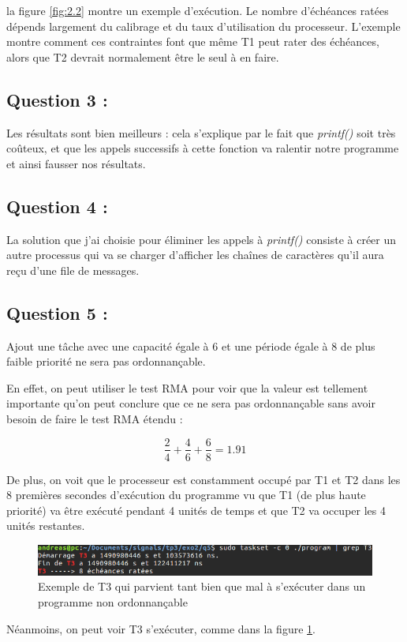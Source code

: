 \documentclass{article}
\begin{document}
la figure \ref{fig:2.2} montre un exemple d'exécution. Le nombre d'échéances ratées dépends largement du calibrage et du taux d'utilisation du processeur. L'exemple montre comment ces contraintes font que même T1 peut rater des échéances, alors que T2 devrait normalement être le seul à en faire.

\subsection*{Question 3 :}

Les résultats sont bien meilleurs : cela s'explique par le fait que \textit{printf()} soit très coûteux, et que les appels successifs à cette fonction va ralentir notre programme et ainsi fausser nos résultats.

\subsection*{Question 4 :}

La solution que j'ai choisie pour éliminer les appels à \textit{printf()} consiste à créer un autre processus qui va se charger d'afficher les chaînes de caractères qu'il aura reçu d'une file de messages.

\subsection*{Question 5 :}

Ajout une tâche avec une capacité égale à 6 et une période égale à 8 de plus faible priorité ne sera pas ordonnançable.

En effet, on peut utiliser le test RMA pour voir que la valeur est tellement importante qu'on peut conclure que ce ne sera pas ordonnançable sans avoir besoin de faire le test RMA étendu :

$$
\frac{2}{4} + \frac{4}{6} + \frac{6}{8} = 1.91
$$

De plus, on voit que le processeur est constamment occupé par T1 et T2 dans les 8 premières secondes d'exécution du programme vu que T1 (de plus haute priorité) va être exécuté pendant 4 unités de temps et que T2 va occuper les 4 unités restantes.

\begin{figure}
  \includegraphics[width=\linewidth]{2-5.png}
  \caption{Exemple de T3 qui parvient tant bien que mal à s'exécuter dans un programme non ordonnançable}
  \label{fig:2.5}
\end{figure}

Néanmoins, on peut voir T3 s'exécuter, comme dans la figure \ref{fig:2.5}.
\end{document}
